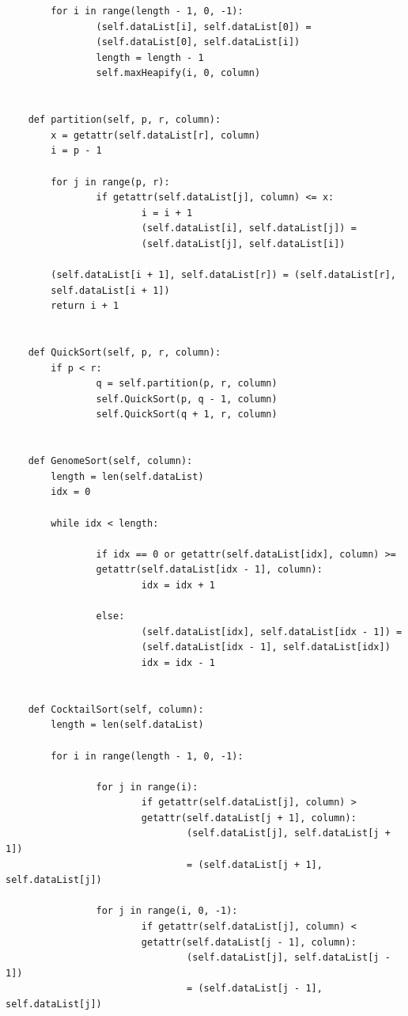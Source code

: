 \documentclass[12pt]{article}
\begin{document}
\begin{verbatim}
        for i in range(length - 1, 0, -1):
                (self.dataList[i], self.dataList[0]) =
                (self.dataList[0], self.dataList[i])
                length = length - 1
                self.maxHeapify(i, 0, column)


    def partition(self, p, r, column):
        x = getattr(self.dataList[r], column)
        i = p - 1

        for j in range(p, r):
                if getattr(self.dataList[j], column) <= x:
                        i = i + 1
                        (self.dataList[i], self.dataList[j]) =
                        (self.dataList[j], self.dataList[i])
        
        (self.dataList[i + 1], self.dataList[r]) = (self.dataList[r],
        self.dataList[i + 1])
        return i + 1


    def QuickSort(self, p, r, column):
        if p < r:
                q = self.partition(p, r, column)
                self.QuickSort(p, q - 1, column)
                self.QuickSort(q + 1, r, column)


    def GenomeSort(self, column):
        length = len(self.dataList)
        idx = 0 

        while idx < length:

                if idx == 0 or getattr(self.dataList[idx], column) >=
                getattr(self.dataList[idx - 1], column):
                        idx = idx + 1

                else:
                        (self.dataList[idx], self.dataList[idx - 1]) =
                        (self.dataList[idx - 1], self.dataList[idx])
                        idx = idx - 1


    def CocktailSort(self, column):
        length = len(self.dataList)

        for i in range(length - 1, 0, -1):

                for j in range(i):
                        if getattr(self.dataList[j], column) >
                        getattr(self.dataList[j + 1], column):
                                (self.dataList[j], self.dataList[j + 1])
                                = (self.dataList[j + 1], self.dataList[j])

                for j in range(i, 0, -1):
                        if getattr(self.dataList[j], column) <
                        getattr(self.dataList[j - 1], column):
                                (self.dataList[j], self.dataList[j - 1])
                                = (self.dataList[j - 1], self.dataList[j]) 


\end{verbatim}
\end{document}
